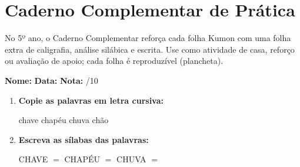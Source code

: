 
\chapter{Caderno Complementar de Prática}

No 5º ano, o Caderno Complementar reforça cada folha Kumon com uma folha extra de caligrafia, análise silábica e escrita. Use como atividade de casa, reforço ou avaliação de apoio; cada folha é reproduzível (plancheta).



\begin{exercicio}



\noindent\textbf{Nome:} \underline{\hspace{3.2cm}} \quad \textbf{Data:} \underline{\hspace{1.6cm}} \quad \textbf{Nota:} \underline{\hspace{0.9cm}}/10


\begin{enumerate}

  \item \textbf{Copie as palavras em letra cursiva:}
  \begin{center}
  chave \quad chapéu \quad chuva \quad chão
  \end{center}
  \begin{center}
  \underline{\hspace{2.4cm}} \quad \underline{\hspace{2.4cm}} \quad \underline{\hspace{2.4cm}} \quad \underline{\hspace{2.4cm}}
  \end{center}

  \item \textbf{Escreva as sílabas das palavras:}
  \begin{center}
  CHAVE $=$ \underline{\hspace{1.5cm}} \underline{\hspace{1.5cm}} \quad CHAPÉU $=$ \underline{\hspace{1.5cm}} \underline{\hspace{1.5cm}} \quad CHUVA $=$ \underline{\hspace{1.5cm}} \underline{\hspace{1.5cm}}
  \end{center}


\end{enumerate}
\end{exercicio}
